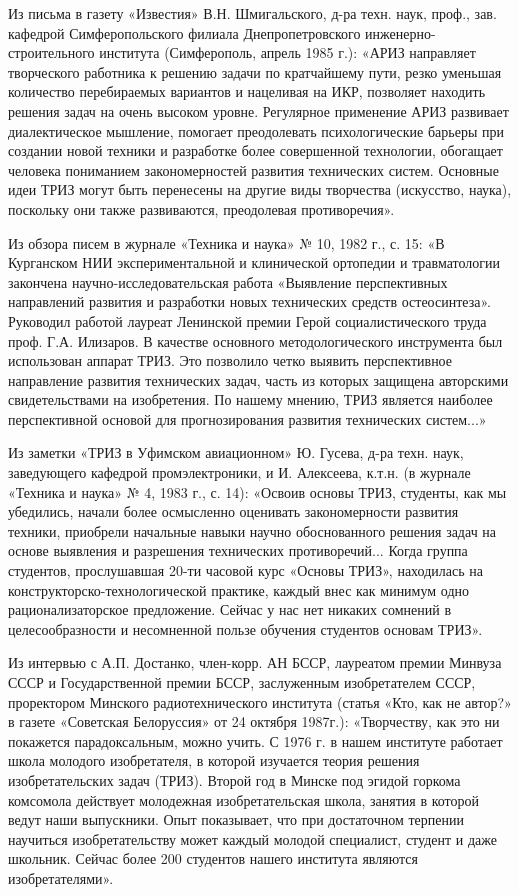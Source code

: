\documentclass[11pt,a4paper]{article}
\begin{document}
Из письма в газету «Известия» В.Н. Шмигальского, д-ра техн. наук, проф.,
зав. кафедрой Симферопольского филиала Днепропетровского
инженерно-строительного института (Симферополь, апрель 1985 г.): «АРИЗ
направляет творческого работника к решению задачи по кратчайшему пути, резко
уменьшая количество перебираемых вариантов и нацеливая на ИКР, позволяет
находить решения задач на очень высоком уровне. Регулярное применение АРИЗ
развивает диалектическое мышление, помогает преодолевать психологические
барьеры при создании новой техники и разработке более совершенной технологии,
обогащает человека пониманием закономерностей развития технических систем.
Основные идеи ТРИЗ могут быть перенесены на другие виды творчества (искусство,
наука), поскольку они также развиваются, преодолевая противоречия».

Из обзора писем в журнале «Техника и наука» № 10, 1982 г., с. 15: «В
Курганском НИИ экспериментальной и клинической ортопедии и травматологии
закончена научно-исследовательская работа «Выявление перспективных направлений
развития и разработки новых технических средств остеосинтеза». Руководил
работой лауреат Ленинской премии Герой социалистического труда
проф. Г.А. Илизаров. В качестве основного методологического инструмента был
использован аппарат ТРИЗ. Это позволило четко выявить перспективное
направление развития технических задач, часть из которых защищена авторскими
свидетельствами на изобретения. По нашему мнению, ТРИЗ является наиболее
перспективной основой для прогнозирования развития технических систем...»

Из заметки «ТРИЗ в Уфимском авиационном» Ю. Гусева, д-ра техн. наук,
заведующего кафедрой промэлектроники, и И. Алексеева, к.т.н. (в журнале
«Техника и наука» № 4, 1983 г., с. 14): «Освоив основы ТРИЗ, студенты, как мы
убедились, начали более осмысленно оценивать закономерности развития техники,
приобрели начальные навыки научно обоснованного решения задач на основе
выявления и разрешения технических противоречий... Когда группа студентов,
прослушавшая 20-ти часовой курс «Основы ТРИЗ», находилась на
конструкторско-технологической практике, каждый внес как минимум одно
рационализаторское предложение. Сейчас у нас нет никаких сомнений в
целесообразности и несомненной пользе обучения студентов основам ТРИЗ».

Из интервью с А.П. Достанко, член-корр. АН БССР, лауреатом премии Минвуза СССР
и Государственной премии БССР, заслуженным изобретателем СССР, проректором
Минского радиотехнического института (статья «Кто, как не автор?» в газете
«Советская Белоруссия» от 24 октября 1987г.): «Творчеству, как это ни
покажется парадоксальным, можно учить. С 1976 г. в нашем институте работает
школа молодого изобретателя, в которой изучается теория решения
изобретательских задач (ТРИЗ). Второй год в Минске под эгидой горкома
комсомола действует молодежная изобретательская школа, занятия в которой ведут
наши выпускники. Опыт показывает, что при достаточном терпении научиться
изобретательству может каждый молодой специалист, студент и даже
школьник. Сейчас более 200 студентов нашего института являются
изобретателями».
\end{document}
